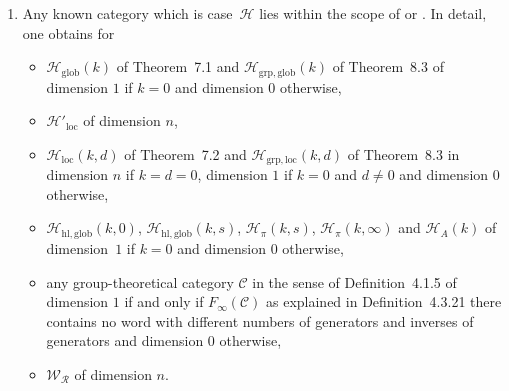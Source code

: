 \documentclass[10pt,a4paper]{amsart}
\numberwithin{equation}{section}
\newcommand{\thedim}{n}
\newcommand{\thecat}{\mathcal{C}}
\begin{document}
\begin{Remark}
\begin{enumerate}
\item  Any known category which is case~$\mathcal{H}$ lies within the scope of \cite{Gromada2018,Maassen2021,TarragoWeber2018} or \cite[Chapter~1]{Mang2022}. In detail, one obtains for %
  \begin{itemize}
  \item $\mathcal{H}_{\mathrm{glob}}(k)$ of Theorem~7.1 and $\mathcal{H}_{\mathrm{grp},\mathrm{glob}}(k)$ of Theorem~8.3 of  \cite{TarragoWeber2018} dimension $1$ if $k=0$ and dimension $0$ otherwise,
  \item $\mathcal{H}'{}_{\mathrm{loc}}$ of \cite[Theorem~7.2]{TarragoWeber2018} dimension $\thedim$,
  \item $\mathcal{H}_{\mathrm{loc}}(k,d)$ of Theorem~7.2 and $\mathcal{H}_{\mathrm{grp},\mathrm{loc}}(k,d)$ of Theorem~8.3 in \cite{TarragoWeber2018} dimension $\thedim$ if $k=d=0$, dimension $1$ if $k=0$ and $d\neq 0$ and dimension $0$ otherwise,
  \item $\mathcal{H}_{\mathrm{hl},\mathrm{glob}}(k,0)$,
 $\mathcal{H}_{\mathrm{hl},\mathrm{glob}}(k,s)$,
 $\mathcal{H}_{\pi}(k,s)$,
 $\mathcal{H}_{\pi}(k,\infty)$ and
 $\mathcal{H}_{A}(k)$ of \cite[Table~1]{Gromada2018} dimension~$1$ if $k= 0$ and dimension $0$ otherwise,
  \item any group-theoretical category $\thecat$ in the sense of Definition~4.1.5 of \cite{Maassen2021} dimension $1$ if and only if $F_\infty(\thecat)$ as explained in Definition~4.3.21 there contains no word with different numbers of generators and inverses of generators and dimension $0$ otherwise,
  \item $\mathcal{W}_{\mathcal{R}}$ of \cite[Chapter~1]{Mang2022} dimension $\thedim$.
  \end{itemize}
      \end{enumerate}
    \end{Remark}
\end{document}
